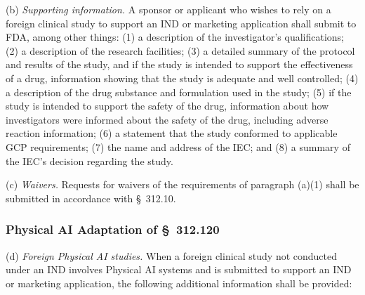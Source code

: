 (b) \textit{Supporting information.} A sponsor or applicant who wishes to rely on a foreign clinical study to support an IND or marketing application shall submit to FDA, among other things: (1) a description of the investigator's qualifications; (2) a description of the research facilities; (3) a detailed summary of the protocol and results of the study, and if the study is intended to support the effectiveness of a drug, information showing that the study is adequate and well controlled; (4) a description of the drug substance and formulation used in the study; (5) if the study is intended to support the safety of the drug, information about how investigators were informed about the safety of the drug, including adverse reaction information; (6) a statement that the study conformed to applicable GCP requirements; (7) the name and address of the IEC; and (8) a summary of the IEC's decision regarding the study.

(c) \textit{Waivers.} Requests for waivers of the requirements of paragraph (a)(1) shall be submitted in accordance with \S~312.10.

\subsubsection{Physical AI Adaptation of \S~312.120}

(d) \textit{Foreign Physical AI studies.} When a foreign clinical study not conducted under an IND involves Physical AI systems and is submitted to support an IND or marketing application, the following additional information shall be provided:

